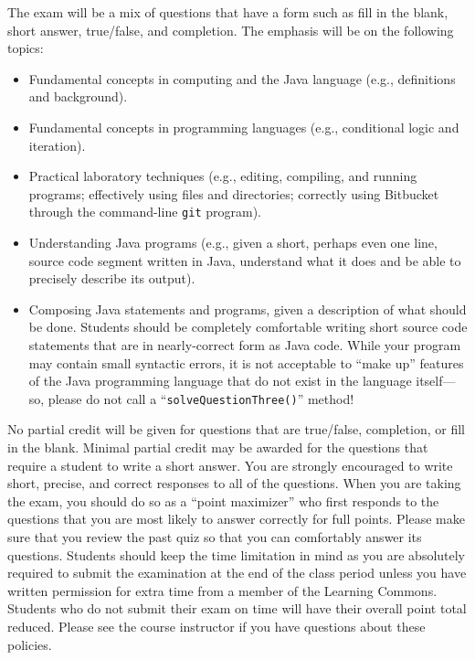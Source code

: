 \noindent The exam will be a mix of questions that have a form such as fill in the blank, short answer, true/false, and
completion.  The emphasis will be on the following topics:

\vspace*{-.05in}
\begin{itemize}

  \itemsep 0in

  \item Fundamental concepts in computing and the Java language (e.g., definitions and background).

  \item Fundamental concepts in programming languages (e.g., conditional logic and iteration).

  \item Practical laboratory techniques (e.g., editing, compiling, and running programs; effectively using files and
    directories; correctly using Bitbucket through the command-line {\tt git} program).

  \item Understanding Java programs (e.g., given a short, perhaps even one line, source code segment written in Java,
    understand what it does and be able to precisely describe its output).

  \item Composing Java statements and programs, given a description of what should be done. Students should be completely
    comfortable writing short source code statements that are in nearly-correct form as Java code. While your program may
    contain small syntactic errors, it is not acceptable to ``make up'' features of the Java programming language that do
    not exist in the language itself---so, please do not call a ``{\tt solveQuestionThree()}'' method!

\end{itemize}

\noindent No partial credit will be given for questions that are true/false, completion, or fill in the blank. Minimal
partial credit may be awarded for the questions that require a student to write a short answer. You are strongly
encouraged to write short, precise, and correct responses to all of the questions. When you are taking the exam, you
should do so as a ``point maximizer'' who first responds to the questions that you are most likely to answer correctly
for full points. Please make sure that you review the past quiz so that you can comfortably answer its questions.
Students should keep the time limitation in mind as you are absolutely required to submit the examination at the end of
the class period unless you have written permission for extra time from a member of the Learning Commons.  Students who
do not submit their exam on time will have their overall point total reduced.  Please see the course instructor if you
have questions about these policies.

